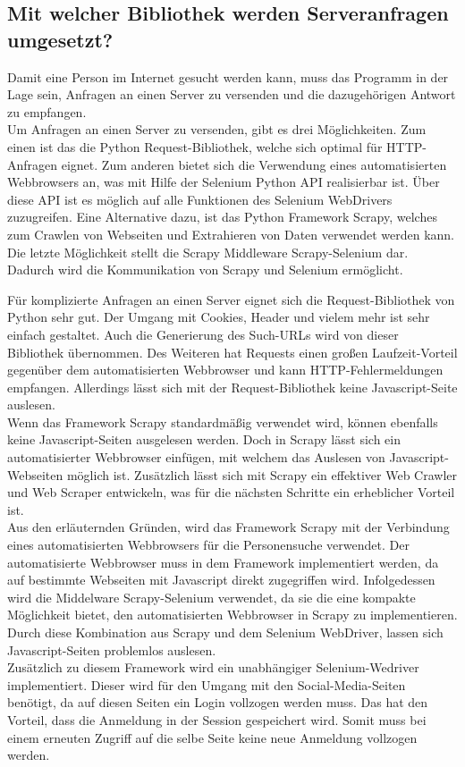 			
		
		\subsection{Mit welcher Bibliothek werden Serveranfragen umgesetzt?}
		Damit eine Person im Internet gesucht werden kann, muss das Programm in der Lage sein, Anfragen an einen Server zu versenden und die dazugehörigen Antwort zu empfangen. \\
		Um Anfragen an einen Server zu versenden, gibt es drei Möglichkeiten. Zum einen ist das die Python Request-Bibliothek, welche sich optimal für HTTP-Anfragen eignet.\cite{WebScraping} Zum anderen bietet sich die Verwendung eines automatisierten Webbrowsers an, was mit Hilfe der Selenium Python API realisierbar ist.\cite{lawson2015web} Über diese API ist es möglich auf alle Funktionen des Selenium WebDrivers zuzugreifen.\cite{SeleniumWithPython} Eine Alternative dazu, ist das Python Framework Scrapy, welches zum Crawlen von Webseiten und Extrahieren von Daten verwendet werden kann.\cite{Scrapy} Die letzte Möglichkeit stellt die  Scrapy Middleware Scrapy-Selenium dar.\cite{scrapy-selenium} Dadurch wird die Kommunikation von Scrapy und Selenium ermöglicht.
		
		Für komplizierte Anfragen an einen Server eignet sich die Request-Bibliothek von Python sehr gut. Der Umgang mit Cookies, Header und vielem mehr ist sehr einfach gestaltet. Auch die Generierung des Such-URLs wird von dieser Bibliothek übernommen. Des Weiteren hat Requests einen großen Laufzeit-Vorteil gegenüber dem automatisierten Webbrowser und kann HTTP-Fehlermeldungen empfangen. Allerdings lässt sich mit der Request-Bibliothek keine Javascript-Seite auslesen.\\
		Wenn das Framework Scrapy standardmäßig verwendet wird, können ebenfalls keine Javascript-Seiten ausgelesen werden. Doch in Scrapy lässt sich ein automatisierter Webbrowser einfügen, mit welchem das Auslesen von Javascript-Webseiten möglich ist. Zusätzlich lässt sich mit Scrapy ein effektiver Web Crawler und Web Scraper entwickeln, was für die nächsten Schritte ein erheblicher Vorteil ist.\\
		Aus den erläuternden Gründen, wird das Framework Scrapy mit der Verbindung eines automatisierten Webbrowsers für die Personensuche verwendet. Der automatisierte Webbrowser muss in dem Framework implementiert werden, da auf bestimmte Webseiten mit Javascript direkt zugegriffen wird. Infolgedessen wird die Middelware Scrapy-Selenium verwendet, da sie die eine kompakte Möglichkeit bietet, den automatisierten Webbrowser in Scrapy zu implementieren. Durch diese Kombination aus Scrapy und dem Selenium WebDriver, lassen sich Javascript-Seiten problemlos auslesen. \\
		Zusätzlich zu diesem Framework wird ein unabhängiger Selenium-Wedriver implementiert. Dieser wird für den Umgang mit den Social-Media-Seiten benötigt, da auf diesen Seiten ein Login vollzogen werden muss. Das hat den Vorteil, dass die Anmeldung in der Session gespeichert wird. Somit muss bei einem erneuten Zugriff auf die selbe Seite keine neue Anmeldung vollzogen werden.
	
